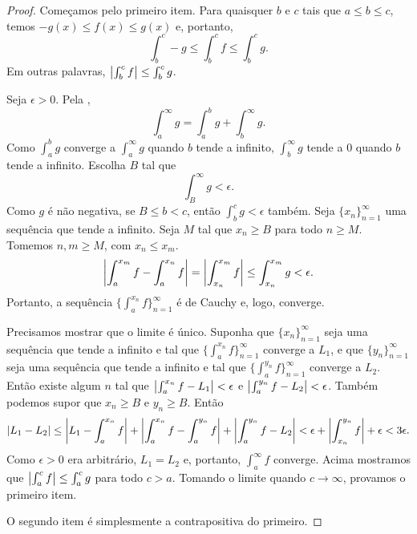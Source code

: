 \begin{proof}
Começamos pelo primeiro item.
Para quaisquer $b$ e $c$ tais que $a \leq b \leq c$, temos
$-g(x) \leq f(x) \leq g(x)$ e, portanto,
\begin{equation*}
\int_b^c -g \leq \int_b^c f \leq \int_b^c g  .
\end{equation*}
Em outras palavras, $\left\lvert {\int_b^c f} \right\rvert \leq \int_b^c g$.

Seja $\epsilon > 0$. Pela
,
\begin{equation*}
\int_a^\infty g =
\int_a^b g +
\int_b^\infty g .
\end{equation*}
Como $\int_a^b g$ converge a
$\int_a^\infty g$ quando $b$ tende a infinito,
$\int_b^\infty g$ tende a 0 quando $b$ tende a infinito. Escolha $B$
tal que
\begin{equation*}
\int_B^\infty g < \epsilon .
\end{equation*}
Como $g$ é não negativa, se $B \leq b < c$, então
$\int_b^c g < \epsilon$ também.
Seja $\{ x_n \}_{n=1}^\infty$ uma sequência que tende a infinito. Seja $M$ tal que
$x_n \geq B$ para todo $n \geq M$. Tomemos $n,m \geq M$,
com $x_n \leq x_m$.
\begin{equation*}
\left\lvert {\int_a^{x_m} f - \int_a^{x_n} f} \right\rvert 
=
\left\lvert {\int_{x_n}^{x_m} f} \right\rvert 
\leq \int_{x_n}^{x_m} g < \epsilon .
\end{equation*}
Portanto, a sequência $\bigl\{ \int_a^{x_n} f \bigr\}_{n=1}^\infty$ é de Cauchy e, logo, converge.

Precisamos mostrar que o limite é único. Suponha que $\{ x_n \}_{n=1}^\infty$ seja uma sequência
que tende a infinito e tal que
$\bigl\{ \int_a^{x_n} f \bigr\}_{n=1}^\infty$ converge a $L_1$, e que $\{y_n\}_{n=1}^\infty$ seja uma sequência
que tende a infinito e tal que
$\bigl\{ \int_a^{y_n} f \bigr\}_{n=1}^\infty$ converge a $L_2$. Então existe algum $n$ tal
que
$\bigl\lvert {\int_a^{x_n} f - L_1} \bigr\rvert < \epsilon$ e
$\bigl\lvert {\int_a^{y_n} f - L_2} \bigr\rvert < \epsilon$. Também podemos supor que $x_n \geq B$
e $y_n \geq B$. Então
\begin{equation*}
\lvert {L_1 - L_2} \rvert \leq
\left\lvert {L_1 - \int_a^{x_n} f} \right\rvert
+
\left\lvert {\int_a^{x_n} f- \int_a^{y_n} f} \right\rvert
+
\left\lvert {\int_a^{y_n} f - L_2} \right\rvert
<
\epsilon
+
\left\lvert {\int_{x_n}^{y_n} f} \right\rvert
+
\epsilon
<
3 \epsilon.
\end{equation*}
Como $\epsilon > 0$ era arbitrário, $L_1 = L_2$ e, portanto,
$\int_a^\infty f$ converge.
Acima mostramos que $\left\lvert {\int_a^c f} \right\rvert \leq \int_a^c g$ para todo $c > a$.
Tomando o limite quando $c \to \infty$, provamos o primeiro item.

O segundo item é simplesmente a contrapositiva do primeiro.
\end{proof}

